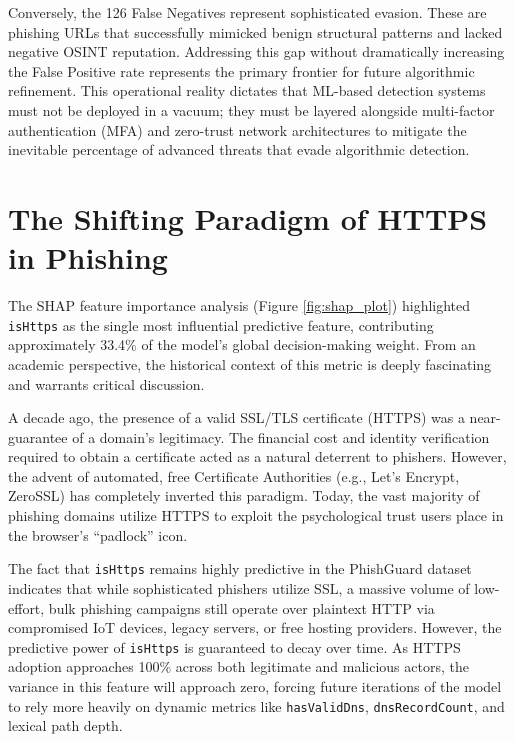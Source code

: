 Conversely, the 126 False Negatives represent sophisticated evasion.
These are phishing URLs that successfully mimicked benign structural
patterns and lacked negative OSINT reputation. Addressing this gap
without dramatically increasing the False Positive rate represents the
primary frontier for future algorithmic refinement. This operational
reality dictates that ML-based detection systems must not be deployed in
a vacuum; they must be layered alongside multi-factor authentication
(MFA) and zero-trust network architectures to mitigate the inevitable
percentage of advanced threats that evade algorithmic detection.

\section{The Shifting Paradigm of HTTPS in
Phishing}\label{the-shifting-paradigm-of-https-in-phishing}

The SHAP feature importance analysis (Figure \ref{fig:shap_plot}) highlighted
\texttt{isHttps} as the single most influential predictive feature,
contributing approximately 33.4\% of the model's global decision-making
weight. From an academic perspective, the historical context of this
metric is deeply fascinating and warrants critical discussion.

A decade ago, the presence of a valid SSL/TLS certificate (HTTPS) was a
near-guarantee of a domain's legitimacy. The financial cost and identity
verification required to obtain a certificate acted as a natural
deterrent to phishers. However, the advent of automated, free
Certificate Authorities (e.g., Let's Encrypt, ZeroSSL) has completely
inverted this paradigm. Today, the vast majority of phishing domains
utilize HTTPS to exploit the psychological trust users place in the
browser's ``padlock'' icon.

The fact that \texttt{isHttps} remains highly predictive in the
PhishGuard dataset indicates that while sophisticated phishers utilize
SSL, a massive volume of low-effort, bulk phishing campaigns still
operate over plaintext HTTP via compromised IoT devices, legacy servers,
or free hosting providers. However, the predictive power of
\texttt{isHttps} is guaranteed to decay over time. As HTTPS adoption
approaches 100\% across both legitimate and malicious actors, the
variance in this feature will approach zero, forcing future iterations
of the model to rely more heavily on dynamic metrics like
\texttt{hasValidDns}, \texttt{dnsRecordCount}, and lexical path depth.

